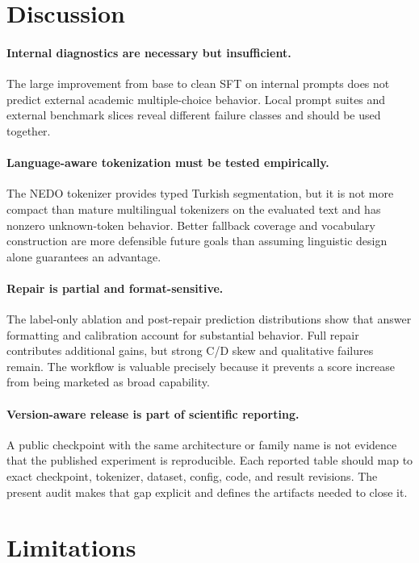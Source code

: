 \documentclass[11pt]{article}
\begin{document}
\section{Discussion}

\paragraph{Internal diagnostics are necessary but insufficient.}
The large improvement from base to clean SFT on internal prompts does not
predict external academic multiple-choice behavior. Local prompt suites and
external benchmark slices reveal different failure classes and should be used
together.

\paragraph{Language-aware tokenization must be tested empirically.}
The NEDO tokenizer provides typed Turkish segmentation, but it is not more
compact than mature multilingual tokenizers on the evaluated text and has
nonzero unknown-token behavior. Better fallback coverage and vocabulary
construction are more defensible future goals than assuming linguistic design
alone guarantees an advantage.

\paragraph{Repair is partial and format-sensitive.}
The label-only ablation and post-repair prediction distributions show that
answer formatting and calibration account for substantial behavior. Full
repair contributes additional gains, but strong C/D skew and qualitative
failures remain. The workflow is valuable precisely because it prevents a
score increase from being marketed as broad capability.

\paragraph{Version-aware release is part of scientific reporting.}
A public checkpoint with the same architecture or family name is not evidence
that the published experiment is reproducible. Each reported table should map
to exact checkpoint, tokenizer, dataset, config, code, and result revisions.
The present audit makes that gap explicit and defines the artifacts needed to
close it.

\section{Limitations}
\end{document}
